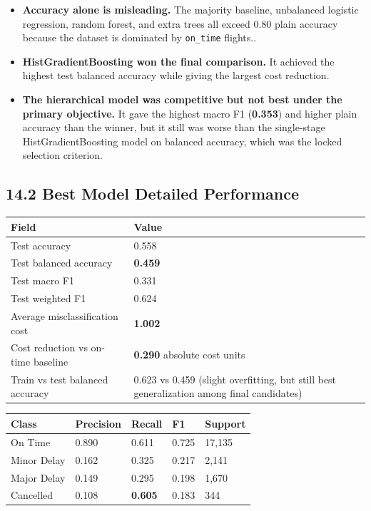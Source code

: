 \documentclass{article}
\newcommand{\code}[1]{\texttt{\small #1}}
\begin{document}
\begin{itemize}[label=\textcolor{accentblue}{\textbullet}]
    \item \textbf{Accuracy alone is misleading.} The majority baseline, unbalanced logistic regression, random forest, and extra trees all exceed 0.80 plain accuracy because the dataset is dominated by \code{on\_time} flights..
    \item \textbf{HistGradientBoosting won the final comparison.} It achieved the highest test balanced accuracy  while giving the largest cost reduction.
    \item \textbf{The hierarchical model was competitive but not best under the primary objective.} It gave the highest macro F1 (\textbf{0.353}) and higher plain accuracy than the winner, but it still was worse than the single-stage HistGradientBoosting model on balanced accuracy, which was the locked selection criterion.
\end{itemize}

\subsection*{\textcolor{accentgold}{14.2 Best Model Detailed Performance}}

\begin{tcolorbox}[mainbox, title={Best Final Run: \code{final-hist\_gradient\_boosting}}]
\renewcommand{\arraystretch}{1.35}
\begin{tabularx}{\textwidth}{L{4.2cm} X}
    \toprule
    \textbf{Field} & \textbf{Value} \\
    \midrule
    Test accuracy & 0.558 \\
    Test balanced accuracy & \textbf{0.459} \\
    Test macro F1 & 0.331 \\
    Test weighted F1 & 0.624 \\
    Average misclassification cost & \textbf{1.002} \\
    Cost reduction vs on-time baseline & \textbf{0.290} absolute cost units \\
    Train vs test balanced accuracy & 0.623 vs 0.459 (slight overfitting, but still best generalization among final candidates) \\
    \bottomrule
\end{tabularx}
\end{tcolorbox}

\renewcommand{\arraystretch}{1.3}
\begin{tabularx}{\textwidth}{L{2.7cm} C{1.5cm} C{1.5cm} C{1.4cm} C{1.5cm}}
    \toprule
    \textbf{Class} & \textbf{Precision} & \textbf{Recall} & \textbf{F1} & \textbf{Support} \\
    \midrule
    On Time & 0.890 & 0.611 & 0.725 & 17,135 \\
    Minor Delay & 0.162 & 0.325 & 0.217 & 2,141 \\
    Major Delay & 0.149 & 0.295 & 0.198 & 1,670 \\
    Cancelled & 0.108 & \textbf{0.605} & 0.183 & 344 \\
    \bottomrule
\end{tabularx}
\end{document}
